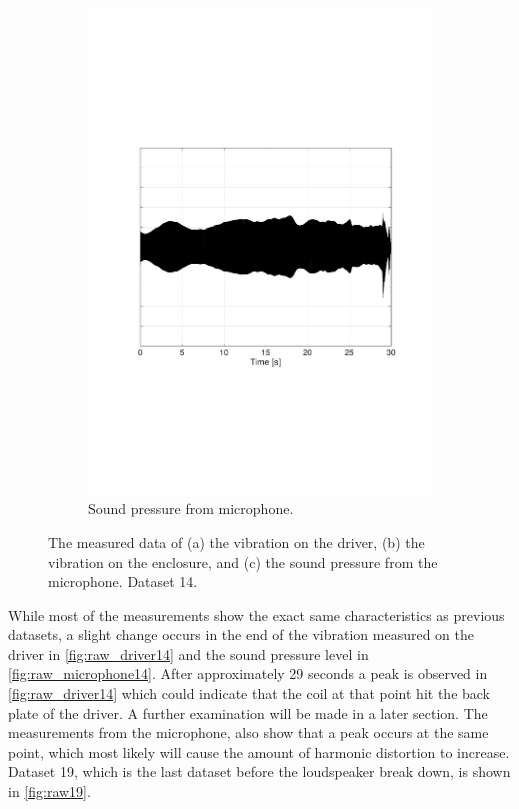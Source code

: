 \begin{figure}[H]
\begin{subfigure}[t]{0.3\textwidth}
	\includegraphics[width=1\textwidth]{figures/raw_microphone14.pdf}
	\caption{Sound pressure from microphone.}
	\label{fig:raw_microphone14}
\end{subfigure}
\caption{The measured data of (a) the vibration on the driver, (b) the vibration on the enclosure, and (c) the sound pressure from the microphone. Dataset 14.}
\label{fig:raw14}
\end{figure} 

While most of the measurements show the exact same characteristics as previous datasets, a slight change occurs in the end of the vibration measured on the driver in \autoref{fig:raw_driver14} and the sound pressure level in \autoref{fig:raw_microphone14}. After approximately 29 seconds a peak is observed in \autoref{fig:raw_driver14} which could indicate that the coil at that point hit the back plate of the driver. A further examination will be made in a later section. The measurements from the microphone, also show that a peak occurs at the same point, which most likely will cause the amount of harmonic distortion to increase. Dataset 19, which is the last dataset before the loudspeaker break down, is shown in \autoref{fig:raw19}.

